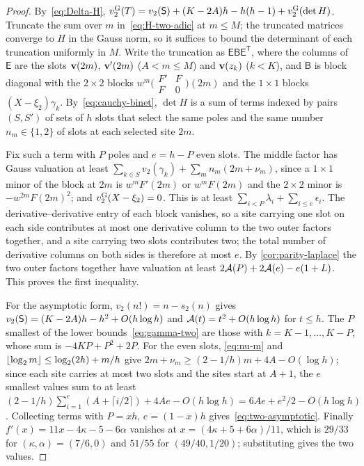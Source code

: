 \begin{proof}
By~\eqref{eq:Delta-H}, $v_{2}^{\mathrm{G}}(T)=v_2(\mathsf{S})+(K-2A)h-h(h-1)+v_{2}^{\mathrm{G}}(\det H)$. Truncate the sum over
$m$ in~\eqref{eq:H-two-adic} at $m\le M$; the truncated matrices converge to $H$ in the Gauss
norm, so it suffices to bound the determinant of each truncation uniformly in $M$. Write the
truncation as $\mathsf E\mathsf B\mathsf E^{\mathsf T}$, where the columns of $\mathsf E$ are the slots $\mathbf{v}(2m)$,
$\mathbf{v}'(2m)$ ($A<m\le M$) and $\mathbf{v}(z_k)$ ($k<K$), and $\mathsf B$ is block diagonal with the $2\times2$
blocks $w^m\bigl(\begin{smallmatrix}F'&F\\F&0\end{smallmatrix}\bigr)(2m)$ and the $1\times1$
blocks $(X-\xi_2)\gamma_k$. By~\eqref{eq:cauchy-binet}, $\det H$ is a sum of terms indexed by
pairs $(S,S')$ of sets of $h$ slots that select the same poles and the same number $n_m\in\{1,2\}$
of slots at each selected site $2m$.

Fix such a term with $P$ poles and $e=h-P$ even slots. The middle factor has Gauss valuation at
least $\sum_{k\in S}v_2(\gamma_k)+\sum_m n_m(2m+\nu_m)$, since a $1\times1$ minor of the block at
$2m$ is $w^mF'(2m)$ or $w^mF(2m)$ and the $2\times2$ minor is $-w^{2m}F(2m)^2$; and
$v_{2}^{\mathrm{G}}(X-\xi_2)=0$. This is at least $\sum_{i<P}\lambda_i+\sum_{i\le e}\epsilon_i$. The
derivative--derivative entry of each block vanishes, so a site carrying one slot on each side
contributes at most one derivative column to the two outer factors together, and a site carrying
two slots contributes two; the total number of derivative columns on both sides is therefore at
most $e$. By \cref{cor:parity-laplace} the two outer factors together have valuation at least
$2\mathcal{A}(P)+2\mathcal{A}(e)-e(1+L)$. This proves the first inequality.

For the asymptotic form, $v_2(n!)=n-s_2(n)$ gives $v_2(\mathsf{S})=(K-2A)h-h^2+O(h\log h)$ and
$\mathcal{A}(t)=t^2+O(h\log h)$ for $t\le h$. The $P$ smallest of the lower
bounds~\eqref{eq:gamma-two} are those with $k=K-1,\dots,K-P$, whose sum is $-4KP+P^2+2P$. For
the even slots, \eqref{eq:nu-m} and $\left\lfloor \log_2m\right\rfloor\le\log_2(2h)+m/h$ give
$2m+\nu_m\ge(2-1/h)m+4A-O(\log h)$; since each site carries at most two slots and the sites
start at $A+1$, the $e$ smallest values sum to at least
$(2-1/h)\sum_{i=1}^{e}(A+\lceil i/2\rceil)+4Ae-O(h\log h)=6Ae+e^2/2-O(h\log h)$. Collecting
terms with $P=xh$, $e=(1-x)h$ gives~\eqref{eq:two-asymptotic}. Finally
$f'(x)=11x-4\kappa-5-6\alpha$ vanishes at $x=(4\kappa+5+6\alpha)/11$, which is $29/33$ for
$(\kappa,\alpha)=(7/6,0)$ and $51/55$ for $(49/40,1/20)$; substituting gives the two values.
\end{proof}

